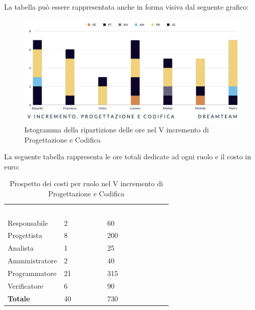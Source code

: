 La tabella può essere rappresentata anche in forma visiva dal seguente grafico:
\begin{figure}[H]
\centering
\includegraphics[scale=0.55]{Sezioni/SezioniPreventivo/grafici/Preventivo_progettazione_V.png}
\caption{Istogramma della ripartizione delle ore nel V incremento di Progettazione e Codifica}
\end{figure}

La seguente tabella rappresenta le ore totali dedicate ad ogni ruolo e il costo in euro:

\begin{table}[H]
\begin{center}
\renewcommand{\arraystretch}{1.5}
\begin{tabular}{ m{}<{\centering}  m{}<{\centering} m{}<{\centering}}
	\rowcolor{darkblue}
	\textcolor{white}{\textbf{Ruolo}}&\textcolor{white}{\textbf{Totale ore}}&\textcolor{white}{\textbf{Costo totale (\euro)}}\\ 

	Responsabile  & 2 & 60 \\	
	
	Progettista & 8 & 200 \\
	
	Analista & 1 & 25 \\

	Amministratore & 2 & 40 \\
	
	Programmatore & 21 & 315 \\
	
	Verificatore & 6 & 90 \\
	
	\textbf{Totale} & 40 & 730 \\
	
\end{tabular}
\caption{Prospetto dei costi per ruolo nel V incremento di Progettazione e Codifica}
\end{center}
\end{table}

